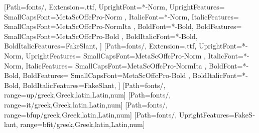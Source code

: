 
\usepackage[mathrm=sym, mathit=sym, mathsf=sym, mathbf=sym]{unicode-math}
\setmainfont{MetaOffcPro}[Path=fonts/,
Extension=.ttf,
UprightFont=*-Norm,
UprightFeatures={
	SmallCapsFont={MetaScOffcPro-Norm}
},
ItalicFont=*-Norm,
ItalicFeatures={
	SmallCapsFont={MetaScOffcPro-NormIta}
},
BoldFont=*-Bold,
BoldFeatures={
	SmallCapsFont={MetaScOffcPro-Bold}
},
BoldItalicFont=*-Bold,
BoldItalicFeatures={FakeSlant},
]
\setsansfont{MetaOffcPro}[Path=fonts/,
Extension=.ttf,
UprightFont=*-Norm,
UprightFeatures={
	SmallCapsFont={MetaScOffcPro-Norm}
},
ItalicFont=*-Norm,
ItalicFeatures={
	SmallCapsFont={MetaScOffcPro-NormIta}
},
BoldFont=*-Bold,
BoldFeatures={
	SmallCapsFont={MetaScOffcPro-Bold}
},
BoldItalicFont=*-Bold,
BoldItalicFeatures={FakeSlant},
]
[Path=fonts/,
range=up/{greek,Greek,latin,Latin,num}]
[Path=fonts/,
range=it/{greek,Greek,latin,Latin,num}]
[Path=fonts/,
range=bfup/{greek,Greek,latin,Latin,num}]
[Path=fonts/, UprightFeatures={FakeSlant},
range=bfit/{greek,Greek,latin,Latin,num}]



\usepackage{polyglossia}
\setmainlanguage{german}

\usepackage[pantone312]{wwustyle-mod}
\usepackage{selnolig}
\usepackage{microtype}

